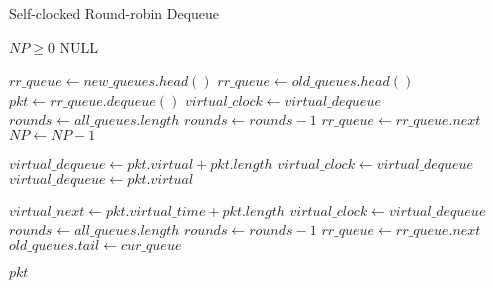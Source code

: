 \begin{algorithm}[b!]
\caption{Self-clocked Round-robin Dequeue}
\label{alg:scrr-deq}
\begin{algorithmic}
\Require $NP \ge 0$
\Return NULL
\EndIf

\Repeat
\State $rr\_queue \gets new\_queues.head()$
\State $rr\_queue \gets old\_queues.head()$
\EndIf
\State $pkt \gets rr\_queue.dequeue()$
\State $virtual\_clock \gets virtual\_dequeue$
\State $rounds \gets all\_queues.length$
\EndIf
\State $rounds \gets rounds - 1$
\State $rr\_queue \gets rr\_queue.next$
\EndIf
{}
\State $NP \gets NP - 1$

\State $virtual\_dequeue \gets pkt.virtual + pkt.length$
\State $virtual\_clock \gets virtual\_dequeue$
\State $virtual\_dequeue \gets pkt.virtual$
\EndIf

\State $virtual\_next \gets pkt.virtual\_time + pkt.length$
\State $virtual\_clock \gets virtual\_dequeue$
\State $rounds \gets all\_queues.length$
\EndIf
\State $rounds \gets rounds - 1$
\State $rr\_queue \gets rr\_queue.next$
\State $old\_queues.tail \gets cur\_queue$
\EndIf

\Return $pkt$
\EndFunction
\end{algorithmic}
\end{algorithm}
